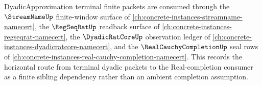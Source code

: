 DyadicApproximation terminal finite packets are consumed through the $\StreamNameUp$ finite-window surface of \autoref{ch:concrete-instances-streamname-namecert}, the $\RegSeqRatUp$ readback surface of \autoref{ch:concrete-instances-regseqrat-namecert}, the $\DyadicRatCoreUp$ observation ledger of \autoref{ch:concrete-instances-dyadicratcore-namecert}, and the $\RealCauchyCompletionUp$ seal rows of \autoref{ch:concrete-instances-real-cauchy-completion-namecert}. This records the horizontal route from terminal dyadic packets to the Real-completion consumer as a finite sibling dependency rather than an ambient completion assumption.
